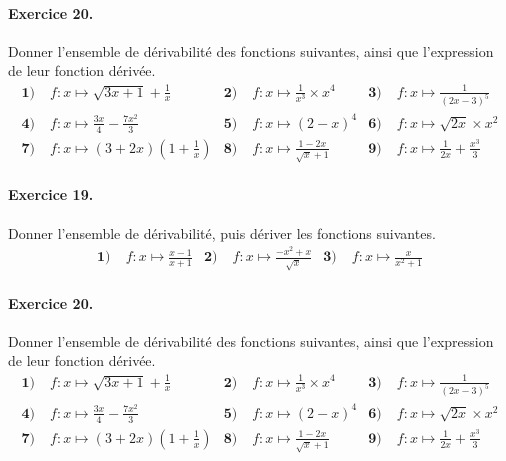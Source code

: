 \documentclass[11pt]{article}
\begin{document}
\paragraph{Exercice 20.} Donner l'ensemble de dérivabilité des fonctions
suivantes, ainsi que l'expression de leur fonction dérivée.
\begin{align*}
  \textbf{1)}\; & f:x\mapsto \sqrt{3x+1}+\frac{1}{x} &
  \textbf{2)}\; & f:x\mapsto \frac{1}{x^3}\times x^4 &
  \textbf{3)}\; & f:x\mapsto \frac{1}{(2x-3)^5} \\
  \textbf{4)}\; & f:x\mapsto \frac{3x}{4}-\frac{7x^2}{3} &
  \textbf{5)}\; & f:x\mapsto (2-x)^4 &
  \textbf{6)}\; & f:x\mapsto \sqrt{2x}\times x^2 \\
  \textbf{7)}\; & f:x\mapsto (3+2x)(1+\frac{1}{x}) &
  \textbf{8)}\; & f:x\mapsto \frac{1-2x}{\sqrt x+1} &
  \textbf{9)}\; & f:x\mapsto \frac{1}{2x}+\frac{x^3}{3}
\end{align*}

\vspace{2cm}

\paragraph{Exercice 19.} Donner l'ensemble de dérivabilité, puis dériver les fonctions suivantes.
\begin{align*}
  \textbf{1)}\; & f:x\mapsto\frac{x-1}{x+1} &
  \textbf{2)}\; & f:x\mapsto\frac{-x^2+x}{\sqrt x} &
  \textbf{3)}\; & f:x\mapsto\frac{x}{x^2+1}
\end{align*}

\paragraph{Exercice 20.} Donner l'ensemble de dérivabilité des fonctions
suivantes, ainsi que l'expression de leur fonction dérivée.
\begin{align*}
  \textbf{1)}\; & f:x\mapsto \sqrt{3x+1}+\frac{1}{x} &
  \textbf{2)}\; & f:x\mapsto \frac{1}{x^3}\times x^4 &
  \textbf{3)}\; & f:x\mapsto \frac{1}{(2x-3)^5} \\
  \textbf{4)}\; & f:x\mapsto \frac{3x}{4}-\frac{7x^2}{3} &
  \textbf{5)}\; & f:x\mapsto (2-x)^4 &
  \textbf{6)}\; & f:x\mapsto \sqrt{2x}\times x^2 \\
  \textbf{7)}\; & f:x\mapsto (3+2x)(1+\frac{1}{x}) &
  \textbf{8)}\; & f:x\mapsto \frac{1-2x}{\sqrt x+1} &
  \textbf{9)}\; & f:x\mapsto \frac{1}{2x}+\frac{x^3}{3}
\end{align*}
\end{document}
